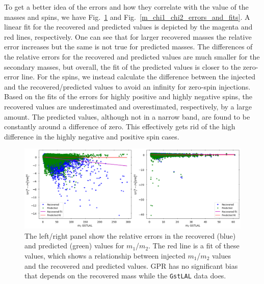\documentclass[aps,prd,twocolumn,superscriptaddress,preprintnumbers,floatfix,nofootinbib]{revtex4-2}
\begin{document}
To get a better idea of the errors and how they correlate with the value of the 
masses and spins, we have Fig.~\ref{m1_m2_chi_errors_and_fits} and 
Fig.~\ref{m_chi1_chi2_errors_and_fits}. A linear fit for the recovered and 
predicted values is depicted by the magenta and red lines, respectively. One
can see that for larger recovered masses the relative error increases but the 
same is not true for predicted masses. The differences of the relative errors 
for the recovered and predicted values are much smaller for the secondary
masses, but overall, the fit of the predicted values is closer to the zero-error 
line. For the spins, we instead calculate the difference between the injected 
and the recovered/predicted values to avoid an infinity for zero-spin injections. 
Based on the fits of the errors for highly positive and highly negative spins, 
the recovered values are underestimated and overestimated, respectively, by a 
large amount. The predicted values, although not in a narrow band, are found to 
be constantly around a difference of zero. This effectively gets rid of the 
high difference in the highly negative and positive spin cases.
\begin{figure}[!h]
	\centering
	\includegraphics[width=\linewidth]{m1_m2_chi_errors_and_fits.png}
	\caption{%
	 		The left/right panel show the relative errors in the recovered (blue) and 
			predicted (green) values for $m_1$/$m_2$. The red line is a fit of these values, which 
			shows a relationship between injected $m_1$/$m_2$ values and the recovered and 
			predicted values. GPR has no significant bias that depends on the recovered mass 
			while the \texttt{GstLAL} data does.}
 	\label{m1_m2_chi_errors_and_fits}
\end{figure}
\end{document}

